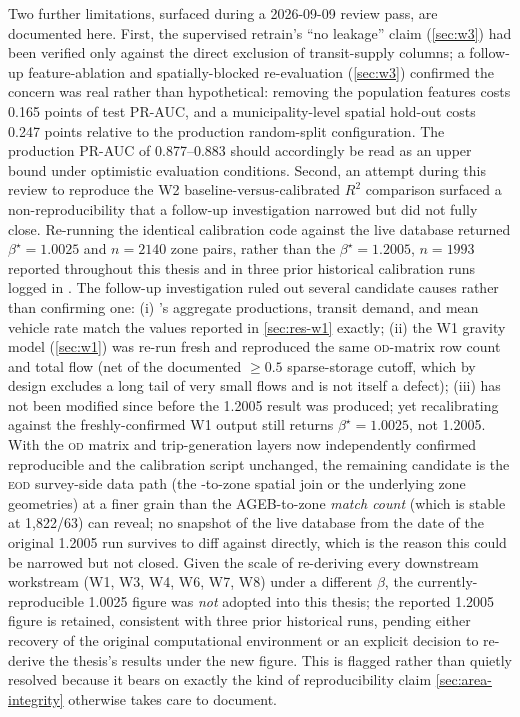 Two further limitations, surfaced during a 2026-09-09 review pass, are documented here.
First, the supervised retrain's ``no leakage'' claim (\cref{sec:w3}) had been verified
only against the direct exclusion of transit-supply columns; a follow-up feature-ablation
and spatially-blocked re-evaluation (\cref{sec:w3}) confirmed the concern was real rather
than hypothetical: removing the population features costs \num{0.165} points of test
PR-AUC, and a municipality-level spatial hold-out costs \num{0.247} points relative to the
production random-split configuration. The production PR-AUC of \num{0.877}--\num{0.883}
should accordingly be read as an upper bound under optimistic evaluation conditions.
Second, an attempt during this review to reproduce the W2 baseline-versus-calibrated
$R^2$ comparison surfaced a non-reproducibility that a follow-up investigation narrowed
but did not fully close. Re-running the identical calibration code against the live
database returned $\beta^\star = \num{1.0025}$ and $n=2140$ zone pairs, rather than the
$\beta^\star = \num{1.2005}$, $n=\num{1993}$ reported throughout this thesis and in three
prior historical calibration runs logged in . The
follow-up investigation ruled out several candidate causes rather than confirming one:
(i) 's aggregate productions, transit demand, and mean
vehicle rate match the values reported in \cref{sec:res-w1} exactly; (ii) the W1 gravity
model (\cref{sec:w1}) was re-run fresh and reproduced the same \textsc{od}-matrix
row count and total flow (net of the documented $\ge\num{0.5}$ sparse-storage cutoff,
which by design excludes a long tail of very small flows and is not itself a defect);
(iii)  has not been modified since before the
\num{1.2005} result was produced; yet recalibrating against the freshly-confirmed W1
output still returns $\beta^\star=\num{1.0025}$, not \num{1.2005}. With the \textsc{od}
matrix and trip-generation layers now independently confirmed reproducible and the
calibration script unchanged, the remaining candidate is the \textsc{eod} survey-side
data path (the \ageb-to-zone spatial join or the underlying zone geometries) at a finer
grain than the AGEB-to-zone \emph{match count} (which is stable at 1,822/63) can reveal;
no snapshot of the live database from the date of the original \num{1.2005} run survives
to diff against directly, which is the reason this could be narrowed but not closed.
Given the scale of re-deriving every downstream workstream (W1, W3, W4, W6, W7, W8) under
a different $\beta$, the currently-reproducible \num{1.0025} figure was \emph{not}
adopted into this thesis; the reported \num{1.2005} figure is retained, consistent with
three prior historical runs, pending either recovery of the original computational
environment or an explicit decision to re-derive the thesis's results under the new
figure. This is flagged rather than quietly resolved because it bears on exactly the
kind of reproducibility claim \cref{sec:area-integrity} otherwise takes care to
document.
